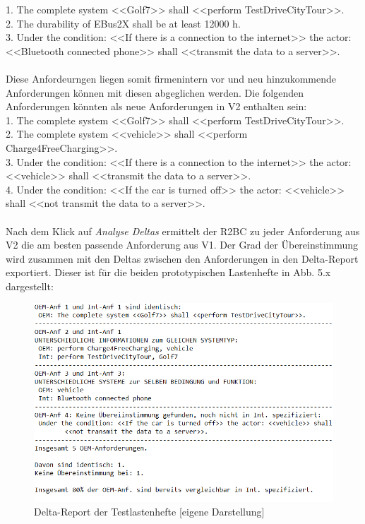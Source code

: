 \documentclass[12pt]{report}
\begin{document}
1. The complete system <<Golf7>> shall <<perform TestDriveCityTour>>.\\

2. The durability of EBus2X shall be at least 12000 h.\\

3. Under the condition: <<If there is a connection to the internet>> the actor: <<Bluetooth connected phone>> shall <<transmit the data to a server>>.\\
\\

Diese Anfordeurngen liegen somit firmenintern vor und neu hinzukommende Anforderungen können mit diesen abgeglichen werden. Die folgenden Anforderungen könnten als neue Anforderungen in V2 enthalten sein:\\

1. The complete system <<Golf7>> shall <<perform TestDriveCityTour>>.\\

2. The complete system <<vehicle>> shall <<perform Charge4FreeCharging>>.\\

3. Under the condition: <<If there is a connection to the internet>> the actor: <<vehicle>> shall <<transmit the data to a server>>.\\

4. Under the condition: <<If the car is turned off>> the actor: <<vehicle>> shall <<not transmit the data to a server>>.\\
\\

Nach dem Klick auf \textit{Analyse Deltas} ermittelt der R2BC zu jeder Anforderung aus V2 die am besten passende Anforderung aus V1. Der Grad der Übereinstimmung wird zusammen mit den Deltas zwischen den Anforderungen in den Delta-Report exportiert. Dieser ist für die beiden prototypischen Lastenhefte in Abb. 5.x dargestellt:

\begin{figure}[h!]
\begin{center}
\includegraphics[scale=0.81]{Bilder/delta-report.png}
\caption{Delta-Report der Testlastenhefte [eigene Darstellung]}
\end{center}
\end{figure}
\end{document}
